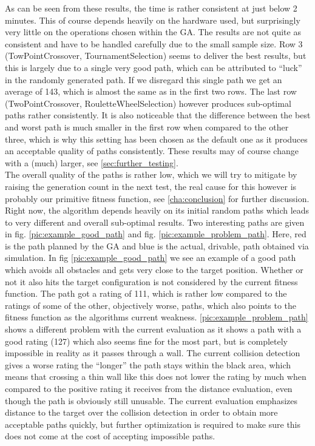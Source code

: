 As can be seen from these results, the time is rather consistent at just below 2 minutes. This of course depends heavily on the hardware used, but surprisingly very little on the operations chosen within the GA. The results are not quite as consistent and have to be handled carefully due to the small sample size. Row 3 (TowPointCrossover, TournamentSelection) seems to deliver the best results, but this is largely due to a single very good path, which can be attributed to "`luck"' in the randomly generated path. If we disregard this single path we get an average of 143, which is almost the same as in the first two rows. The last row (TwoPointCrossover, RouletteWheelSelection) however produces sub-optimal paths rather consistently. It is also noticeable that the difference between the best and worst path is much smaller in the first row when compared to the other three, which is why this setting has been chosen as the default one as it produces an acceptable quality of paths consistently. These results may of course change with a (much) larger, see \ref{sec:further_testing}.\\
The overall quality of the paths is rather low, which we will try to mitigate by raising the generation count in the next test, the real cause for this however is probably our primitive fitness function, see \ref{cha:conclusion} for further discussion. Right now, the algorithm depends heavily on its initial random paths which leads to very different and overall sub-optimal results.
Two interesting paths are given in fig. \ref{pic:example_good_path} and fig. \ref{pic:example_problem_path}. Here, red is the path planned by the GA and blue is the actual, drivable, path obtained via simulation. In fig \ref{pic:example_good_path} we see an example of a good path which avoids all obstacles and gets very close to the target position. Whether or not it also hits the target configuration is not considered by the current fitness function. The path got a rating of 111, which is rather low compared to the ratings of some of the other, objectively worse, paths, which also points to the fitness function as the algorithms current weakness. \ref{pic:example_problem_path} shows a different problem with the current evaluation as it shows a path with a good rating (127) which also seems fine for the most part, but is completely impossible in reality as it passes through a wall. The current collision detection gives a worse rating the "`longer"' the path stays within the black area, which means that crossing a thin wall like this does not lower the rating by much when compared to the positive rating it receives from the distance evaluation, even though the path is obviously still unusable. The current evaluation emphasizes distance to the target over the collision detection in order to obtain more acceptable paths quickly, but further optimization is required to make sure this does not come at the cost of accepting impossible paths.

